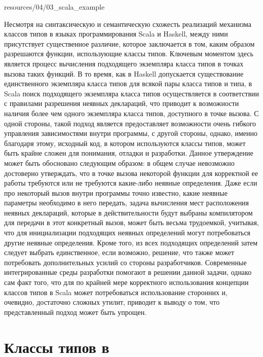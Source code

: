 
{resources/04/03_scala_example}

Несмотря на синтаксическую и семантическую схожесть реализаций механизма классов типов в языках программирования Scala и Haskell, между ними присутствует существенное различие, которое заключается в том, каким образом разрешаются функции, использующие классы типов. Ключевым моментом здесь является процесс вычисления подходящего экземпляра класса типов в точках вызова таких функций. В то время, как в Haskell допускается существование единственного экземпляра класса типов для всякой пары класса типов и типа, в Scala поиск подходящего экземпляра класса типов осуществляется в соответствии с правилами разрешения неявных деклараций, что приводит к возможности наличия более чем одного экземпляра класса типов, доступного в точке вызова. С одной стороны, такой подход является предоставляет возможности очень гибкого управления зависимостями внутри программы, с другой стороны, однако, именно благодаря этому, исходный код, в котором используются классы типов, может быть крайне сложен для понимания, отладки и разработки. Данное утверждение может быть обосновано следующим образом: в общем случае невозможно достоверно утверждать, что в точке вызова некоторой функции для корректной ее работы требуются или не требуются какие-либо неявные определения. Даже если про некоторый вызов внутри программы точно известно, какие неявные параметры необходимо в него передать, задача вычисления мест расположения неявных деклараций, которые в действительности будут выбраны компилятором для передачи в этот конкретный вызов, может быть весьма трудоемкой, учитывая, что  для инициализации подходящих неявных определений могут потребоваться другие неявные определения. Кроме того, из всех подходящих определений затем следует выбрать единственное, если возможно, решение, что также может потребовать дополнительных усилий со стороны разработчиков. Современные интегрированные среды разработки помогают в решении данной задачи, однако сам факт того, что для по крайней мере корректного использования концепции классов типов в Scala может потребоваться использование сторонних и, очевидно, достаточно сложных утилит, приводит к выводу о том, что представленный подход может быть упрощен.    

\section{Классы типов в \cpp}

